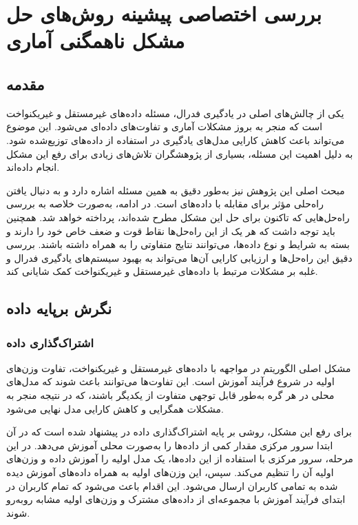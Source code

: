 \chapter{بررسی اختصاصی پیشینه روش‌های حل مشکل ناهمگنی آماری}

\section{مقدمه}
یکی از چالش‌های اصلی در یادگیری فدرال، مسئله داده‌های غیرمستقل و غیریکنواخت
است که منجر به بروز مشکلات آماری و تفاوت‌های داده‌ای می‌شود. این موضوع می‌تواند باعث کاهش کارایی مدل‌های یادگیری در استفاده از داده‌های توزیع‌شده شود. به دلیل اهمیت این مسئله، بسیاری از پژوهشگران تلاش‌های زیادی برای رفع این مشکل انجام داده‌اند.

مبحث اصلی این پژوهش نیز به‌طور دقیق به همین مسئله اشاره دارد و به دنبال یافتن راه‌حلی مؤثر برای مقابله با داده‌های
است. در ادامه، به‌صورت خلاصه به بررسی راه‌حل‌هایی که تاکنون برای حل این مشکل مطرح شده‌اند، پرداخته خواهد شد. همچنین باید توجه داشت که هر یک از این راه‌حل‌ها نقاط قوت و ضعف خاص خود را دارند و بسته به شرایط و نوع داده‌ها، می‌توانند نتایج متفاوتی را به همراه داشته باشند. بررسی دقیق این راه‌حل‌ها و ارزیابی کارایی آن‌ها می‌تواند به بهبود سیستم‌های یادگیری فدرال و غلبه بر مشکلات مرتبط با داده‌های غیرمستقل و غیریکنواخت کمک شایانی کند.

\section{نگرش برپایه داده}
\subsection{اشتراک‌گذاری داده}
مشکل اصلی الگوریتم
در مواجهه با داده‌های غیرمستقل و غیریکنواخت، تفاوت وزن‌های اولیه در شروع فرآیند آموزش است. این تفاوت‌ها می‌توانند باعث شوند که مدل‌های محلی در هر گره به‌طور قابل توجهی متفاوت از یکدیگر باشند، که در نتیجه منجر به مشکلات همگرایی و کاهش کارایی مدل نهایی می‌شود.

برای رفع این مشکل، روشی
بر پایه اشتراک‌گذاری داده در
\cite{zhao2018federated}
پیشنهاد شده است که در آن ابتدا سرور مرکزی مقدار کمی از داده‌ها را به‌صورت محلی آموزش می‌دهد. در این مرحله، سرور مرکزی با استفاده از این داده‌ها، یک مدل اولیه را آموزش داده و وزن‌های اولیه آن را تنظیم می‌کند. سپس، این وزن‌های اولیه به همراه داده‌های آموزش دیده شده به تمامی کاربران ارسال می‌شود. این اقدام باعث می‌شود که تمام کاربران در ابتدای فرآیند آموزش با مجموعه‌ای از داده‌های مشترک و وزن‌های اولیه مشابه روبه‌رو شوند.

